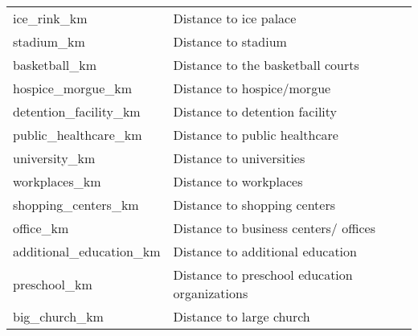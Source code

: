 \begin{longtable}[c]{ll}
    ice\_rink\_km                              & Distance to ice palace                                                                                                    \\
    stadium\_km                                & Distance to stadium                                                                                                       \\
    basketball\_km                             & Distance to the basketball courts                                                                                         \\
    hospice\_morgue\_km                        & Distance to hospice/morgue                                                                                                \\
    detention\_facility\_km                    & Distance to detention facility                                                                                            \\
    public\_healthcare\_km                     & Distance to public healthcare                                                                                             \\
    university\_km                             & Distance to universities                                                                                                  \\
    workplaces\_km                             & Distance to workplaces                                                                                                    \\
    shopping\_centers\_km                      & Distance to shopping centers                                                                                              \\
    office\_km                                 & Distance to business centers/ offices                                                                                     \\
    additional\_education\_km                  & Distance to additional education                                                                                          \\
    preschool\_km                              & Distance to preschool education organizations                                                                             \\
    big\_church\_km                            & Distance to large church                                                                                                  \\

\end{longtable}
